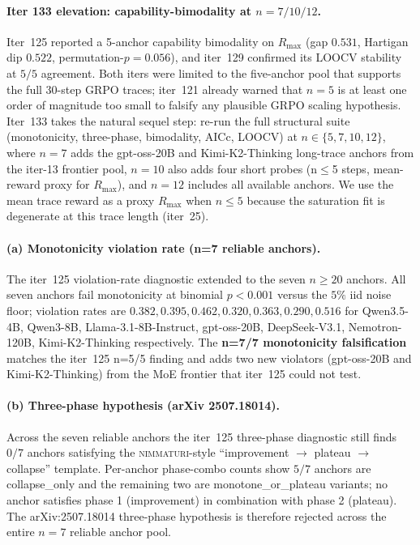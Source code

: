 
\paragraph{Iter 133 elevation: capability-bimodality at $n = 7 / 10 / 12$.}
\label{par:scaling-iter133}
Iter~125 reported a 5-anchor capability bimodality on $R_{\max}$ (gap
$0.531$, Hartigan dip $0.522$, permutation-$p = 0.056$), and iter~129
confirmed its LOOCV stability at $5/5$ agreement.  Both iters were
limited to the five-anchor pool that supports the full 30-step GRPO
traces; iter~121 already warned that $n = 5$ is at least one order of
magnitude too small to falsify any plausible GRPO scaling hypothesis.
Iter~133 takes the natural sequel step: re-run the full structural
suite (monotonicity, three-phase, bimodality, AICc, LOOCV) at
$n \in \{5, 7, 10, 12\}$, where $n = 7$ adds the gpt-oss-20B and
Kimi-K2-Thinking long-trace anchors from the iter-13 frontier pool,
$n = 10$ also adds four short probes (n$\le$5 steps, mean-reward
proxy for $R_{\max}$), and $n = 12$ includes all available anchors.
We use the mean trace reward as a proxy $R_{\max}$ when $n \le 5$
because the saturation fit is degenerate at this trace length
(iter~25).

\paragraph{(a) Monotonicity violation rate (n=7 reliable anchors).}
\label{par:scaling-iter133-mono}
The iter~125 violation-rate diagnostic extended to the seven
$n \ge 20$ anchors.  All seven anchors fail monotonicity at
binomial $p < 0.001$ versus the $5\%$ iid noise floor; violation
rates are $0.382, 0.395, 0.462, 0.320, 0.363, 0.290, 0.516$ for
Qwen3.5-4B, Qwen3-8B, Llama-3.1-8B-Instruct, gpt-oss-20B,
DeepSeek-V3.1, Nemotron-120B, Kimi-K2-Thinking respectively.  The
\textbf{n=7/7 monotonicity falsification} matches the iter~125
n=5/5 finding and adds two new violators (gpt-oss-20B and
Kimi-K2-Thinking) from the MoE frontier that iter~125 could not
test.

\paragraph{(b) Three-phase hypothesis (arXiv 2507.18014).}
\label{par:scaling-iter133-tp}
Across the seven reliable anchors the iter~125 three-phase
diagnostic still finds $0/7$ anchors satisfying the
\textsc{nimmaturi}-style ``improvement $\to$ plateau $\to$
collapse'' template.  Per-anchor phase-combo counts show $5/7$
anchors are collapse_only and the remaining two are
monotone\_or\_plateau variants; no anchor satisfies phase 1
(improvement) in combination with phase 2 (plateau).  The
arXiv:2507.18014 three-phase hypothesis is therefore rejected
across the entire $n = 7$ reliable anchor pool.

